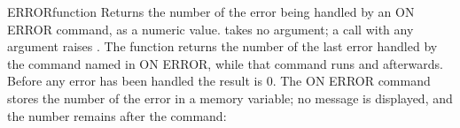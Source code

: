 \begin{XbaseEntry}{ERROR}{function}
Returns the number of the error being handled by an ON ERROR command, as a numeric value.
\Syntax
{}
\Usage
{} takes no argument; a call with any argument raises . The function returns the number of the last error handled by the command named in ON ERROR, while that command runs and afterwards. Before any error has been handled the result is 0.
\Examples
The ON ERROR command stores the number of the error in a memory variable; no message is displayed, and the number remains after the command:
\end{XbaseEntry}


